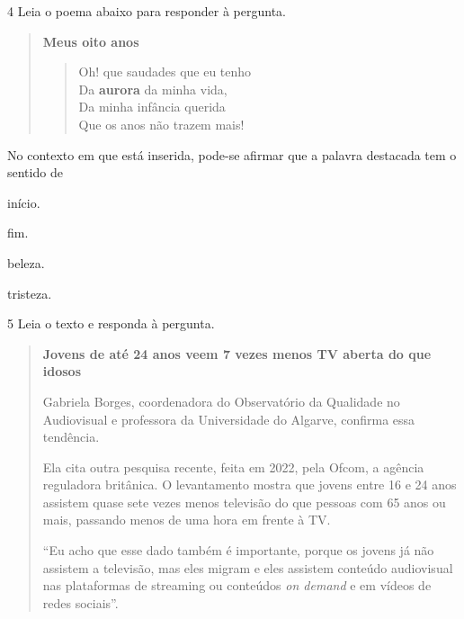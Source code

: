 \num{4} Leia o poema abaixo para responder à pergunta.

\begin{quote}
\textbf{Meus oito anos}

\begin{verse}
Oh! que saudades que eu tenho\\
Da \textbf{aurora} da minha vida,\\
Da minha infância querida\\
Que os anos não trazem mais! 
\end{verse}

\end{quote}


No contexto em que está inserida, pode-se afirmar que a palavra destacada
tem o sentido de

\begin{escolha}
  \item início.
  \item fim.
  \item beleza.
  \item tristeza.
\end{escolha} 


\num{5} Leia o texto e responda à pergunta.

\begin{quote}
\textbf{Jovens de até 24 anos veem 7 vezes menos TV aberta do que idosos}

Gabriela Borges, coordenadora do Observatório da Qualidade no
Audiovisual e professora da Universidade do Algarve, confirma essa
tendência.

Ela cita outra pesquisa recente, feita em 2022, pela Ofcom, a agência
reguladora britânica. O levantamento mostra que jovens entre 16 e 24
anos assistem quase sete vezes menos televisão do que pessoas com 65
anos ou mais, passando menos de uma hora em frente à TV.

``Eu acho que esse dado também é importante, porque os jovens já não
assistem a televisão, mas eles migram e eles assistem conteúdo
audiovisual nas plataformas de streaming ou conteúdos \textit{on demand}
e em vídeos de redes sociais''.
\end{quote}


